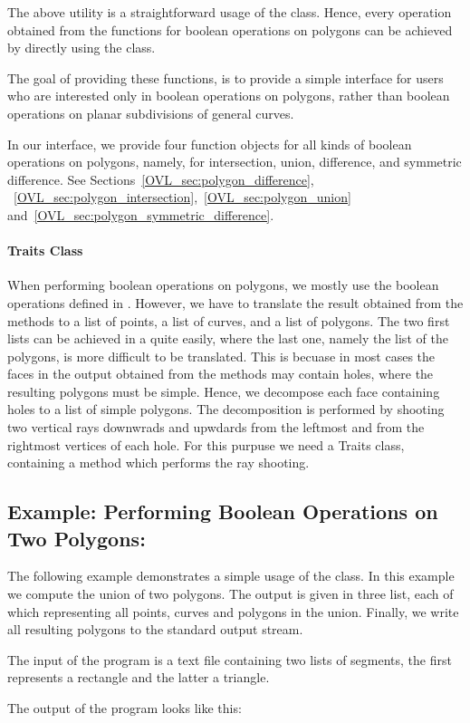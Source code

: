 \begin{ccTexOnly}
The above utility is a straightforward usage of the 
class. Hence, every operation obtained from the functions 
for boolean operations on polygons can be achieved by 
directly using the  
class. 

The goal of providing these functions, is to 
provide a simple interface for users who are 
interested only in boolean operations on 
polygons, rather than boolean operations 
on planar subdivisions of general curves.

In our interface, we provide four function objects 
for all kinds of boolean operations on polygons,
namely, for intersection, union, difference, and 
symmetric difference.
See Sections~\ref{OVL_sec:polygon_difference},
~\ref{OVL_sec:polygon_intersection},~\ref{OVL_sec:polygon_union} 
and~\ref{OVL_sec:polygon_symmetric_difference}. 

\paragraph{Traits Class}
When performing boolean operations on polygons, 
we mostly use the boolean operations defined in 
.
However, we have to translate the result obtained from the 
 methods to a list 
of points, a list of curves, and a list of polygons.
The two first lists can be achieved in a quite easily,
where the last one, namely the list of the polygons,
is more difficult to be translated. This is becuase 
in most cases the faces in the output obtained from the 
 methods may contain holes,
where the resulting polygons must be simple.
Hence, we decompose each face containing holes to a list 
of simple polygons. The decomposition is performed by shooting 
two vertical rays downwrads and upwdards from the leftmost 
and from the rightmost vertices of each hole. 
For this purpuse we need a Traits class, containing a method 
which performs the ray shooting. 

\subsection*{Example: Performing Boolean Operations on Two Polygons:}
The following example demonstrates a simple usage of the 
 class.
In this example we compute the union of two polygons.
The output is given in three list, each of which
representing all points, curves and polygons in the union.
Finally, we write all resulting polygons to the standard output stream. 


The input of the program is a text file containing two lists of segments, 
the first represents a rectangle and the latter a triangle.

The output of the program looks like this:

\end{ccTexOnly}    







